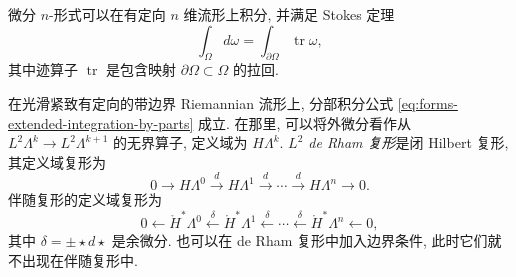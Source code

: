 \begin{MBSourceBox}
{微分 $n$-形式可以在有定向 $n$ 维流形上积分, 并满足 Stokes 定理}
\[
\int_\Omega d\omega=\int_{\partial\Omega}\operatorname{tr}\omega,
\]
{其中迹算子 $\operatorname{tr}$ 是包含映射 $\partial\Omega\subset\Omega$ 的拉回.}

{在光滑紧致有定向的带边界 Riemannian 流形上, 分部积分公式 \eqref{eq:forms-extended-integration-by-parts} 成立. 在那里, 可以将外微分看作从 $L^2\Lambda^k\to L^2\Lambda^{k+1}$ 的无界算子, 定义域为 $H\Lambda^k$. \emph{$L^2$ de Rham 复形}是闭 Hilbert 复形, 其定义域复形为}
\[
0\to H\Lambda^0\xrightarrow{d}H\Lambda^1\xrightarrow{d}\cdots\xrightarrow{d}H\Lambda^n\to0.
\]
{伴随复形的定义域复形为}
\[
0\leftarrow\mathring H^*\Lambda^0\xleftarrow{\delta}\mathring H^*\Lambda^1\xleftarrow{\delta}\cdots\xleftarrow{\delta}\mathring H^*\Lambda^n\leftarrow0,
\]
{其中 $\delta=\pm\star d\star$ 是余微分. 也可以在 de Rham 复形中加入边界条件, 此时它们就不出现在伴随复形中.}
\end{MBSourceBox}

